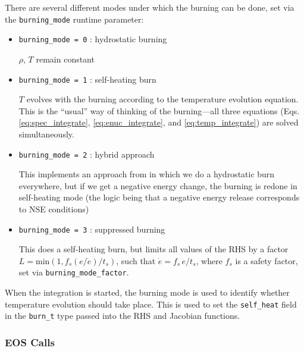 There are several different modes under which the burning can be done, set
via the {\tt burning\_mode} runtime parameter:
\begin{itemize}
\item {\tt burning\_mode = 0} : hydrostatic burning

  $\rho$, $T$ remain constant

\item {\tt burning\_mode = 1} : self-heating burn

  $T$ evolves with the burning according to the temperature evolution
  equation.  This is the ``usual'' way of thinking of the
  burning---all three equations (Eqs. \ref{eq:spec_integrate},
  \ref{eq:enuc_integrate}, and \ref{eq:temp_integrate}) are solved
  simultaneously.

\item {\tt burning\_mode = 2} : hybrid approach

  This implements an approach from \cite{raskin:2010} in which we do a
  hydrostatic burn everywhere, but if we get a negative energy change,
  the burning is redone in self-heating mode (the logic being that a
  negative energy release corresponds to NSE conditions)

\item {\tt burning\_mode = 3} : suppressed burning

  This does a self-heating burn, but limits all values of the RHS
  by a factor $L = \text{min}(1, f_s (e / \dot{e}) / t_s)$, such
  that $\dot{e} = f_s\, e / t_s$, where $f_s$ is a safety factor,
  set via {\tt burning\_mode\_factor}.


\end{itemize}

When the integration is started, the burning mode is used to identify
whether temperature evolution should take place.  This is used to
set the {\tt self\_heat} field in the {\tt burn\_t} type passed
into the RHS and Jacobian functions.



\subsubsection{EOS Calls}

